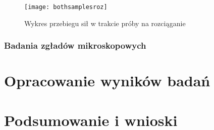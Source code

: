 \documentclass[magister,druk]{dyplom}
\begin{document}
\begin{figure}
	\texttt{[image: bothsamplesroz]}
	\caption{Wykres przebiegu sił w trakcie próby na rozciąganie}
\end{figure}

\subsection{Badania zgładów mikroskopowych}

\chapter{Opracowanie wyników badań}
\chapter{Podsumowanie i wnioski}

\nocite{*}


\end{document}

